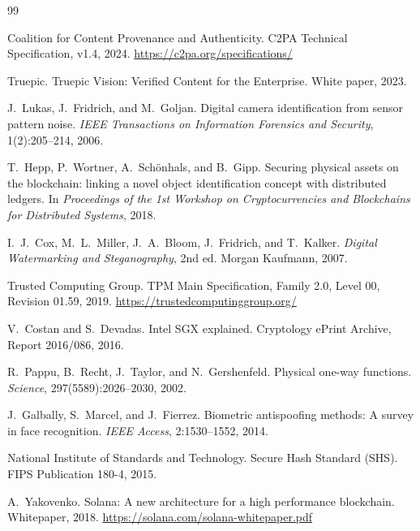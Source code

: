 \documentclass[11pt]{article}
\begin{document}

\begin{thebibliography}{99}

Coalition for Content Provenance and Authenticity.
\newblock C2PA Technical Specification, v1.4, 2024.
\newblock \url{https://c2pa.org/specifications/}

Truepic.
\newblock Truepic Vision: Verified Content for the Enterprise.
\newblock White paper, 2023.

J.~Lukas, J.~Fridrich, and M.~Goljan.
\newblock Digital camera identification from sensor pattern noise.
\newblock \emph{IEEE Transactions on Information Forensics and Security},
  1(2):205--214, 2006.

T.~Hepp, P.~Wortner, A.~Schönhals, and B.~Gipp.
\newblock Securing physical assets on the blockchain: linking a novel object
  identification concept with distributed ledgers.
\newblock In \emph{Proceedings of the 1st Workshop on Cryptocurrencies and
  Blockchains for Distributed Systems}, 2018.

I.~J.~Cox, M.~L.~Miller, J.~A.~Bloom, J.~Fridrich, and T.~Kalker.
\newblock \emph{Digital Watermarking and Steganography}, 2nd ed.
\newblock Morgan Kaufmann, 2007.

Trusted Computing Group.
\newblock TPM Main Specification, Family 2.0, Level 00, Revision 01.59, 2019.
\newblock \url{https://trustedcomputinggroup.org/}

V.~Costan and S.~Devadas.
\newblock Intel SGX explained.
\newblock Cryptology ePrint Archive, Report 2016/086, 2016.

R.~Pappu, B.~Recht, J.~Taylor, and N.~Gershenfeld.
\newblock Physical one-way functions.
\newblock \emph{Science}, 297(5589):2026--2030, 2002.

J.~Galbally, S.~Marcel, and J.~Fierrez.
\newblock Biometric antispoofing methods: A survey in face recognition.
\newblock \emph{IEEE Access}, 2:1530--1552, 2014.

National Institute of Standards and Technology.
\newblock Secure Hash Standard (SHS).
\newblock FIPS Publication 180-4, 2015.

A.~Yakovenko.
\newblock Solana: A new architecture for a high performance blockchain.
\newblock Whitepaper, 2018.
\newblock \url{https://solana.com/solana-whitepaper.pdf}


\end{thebibliography}
\end{document}
